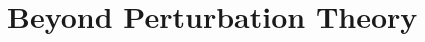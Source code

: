 \documentclass[11pt,a4paper]{article}
\makeatletter
\numberwithin{equation}{subsection}
\newcommand{\checklabel}[2]{%
  \begingroup
  \def\@currentlabel{#2}%
  \label{#1}%
  \endgroup
}
\makeatother
\begin{document}
\setcounter{section}{28}
\section{Beyond Perturbation Theory}

\checklabel{eq:26.A.2}{26.A.2}
\checklabel{eq:25.2.31}{25.2.31}
\checklabel{eq:25.2.32}{25.2.32}
\checklabel{eq:25.2.36}{25.2.36}
\checklabel{eq:26.4.16}{26.4.16}
\checklabel{eq:26.7.45}{26.7.45}
\checklabel{ch29-ref-1}{1}
\checklabel{ch29-ref-1a}{1a}
\checklabel{ch29-ref-2}{2}



\end{document}
